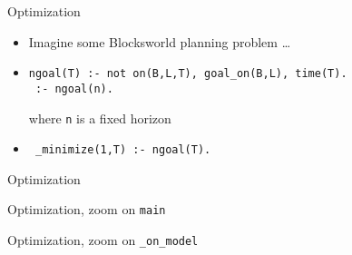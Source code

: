 \begin{frame}[fragile]{Optimization}
  \bigskip
  \begin{itemize}
  \item Imagine some Blocksworld planning problem \dots
    \smallskip
  \item {}
\begin{lstlisting}[language=clingo,basicstyle=\ttfamily\small]
 ngoal(T) :- not on(B,L,T), goal_on(B,L), time(T).
 :- ngoal(n).
\end{lstlisting}
    where \texttt{n} is a fixed horizon
    \medskip
  \item<2-> 
\begin{lstlisting}
 _minimize(1,T) :- ngoal(T).
\end{lstlisting}
  \end{itemize}
\end{frame}
\begin{frame}{Optimization}
  
\end{frame}
\begin{frame}[fragile,shrink=37]{Optimization, zoom on \texttt{main}}
  \bigskip
  
\end{frame}
\begin{frame}[fragile,shrink=25]{Optimization, zoom on \texttt{\_on\_model}}
  \bigskip
  
\end{frame}
%
